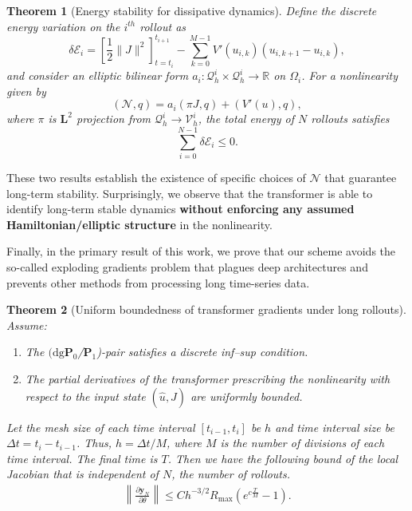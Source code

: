 \documentclass[12pt]{article}
\newtheorem{theorem}{Theorem}
\begin{document}
\begin{theorem}[Energy stability for dissipative dynamics] \label{thm:dissipative}
    Define the discrete energy variation on the $i^{th}$ rollout as
    \begin{equation*}
        \delta \mathcal{E}_i = \left[\frac12 \|J\|^2\right]_{t = t_{i}}^{t_{i+1}} - \sum_{k=0}^{M-1} V'(u_{i,k}) \left( u_{i,k+1} - u_{i,k}\right),
    \end{equation*}
    and consider an elliptic bilinear form $a_i:\mathcal{Q}_h^i \times \mathcal{Q}_h^i \rightarrow \mathbb{R}$ on $\Omega_i$.  For a nonlinearity given by
    \begin{equation*}
        (\mathcal{N},q) = a_i(\pi J, q) + (V'(u),q),
    \end{equation*}
    where $\pi$ is $\mathbf{L}^2$ projection from $\mathcal{Q}_h^i\rightarrow\mathcal{V}_h^i$,  the total energy of $N$ rollouts satisfies
    \begin{equation*}
       \sum_{i=0}^{N-1} \delta \mathcal{E}_i \leq 0.
    \end{equation*}
\end{theorem}
These two results establish the existence of specific choices of $\mathcal{N}$ that guarantee long-term stability. Surprisingly, we observe that the transformer is able to identify long-term stable dynamics \textbf{without enforcing any assumed Hamiltonian/elliptic structure} in the nonlinearity.

Finally, in the primary result of this work, we prove that our scheme avoids the so-called exploding gradients problem that plagues deep architectures and prevents other methods from processing long time-series data.

\begin{theorem}[Uniform boundedness of transformer gradients under long rollouts] \label{thm:bounded_jacobian}
	Assume:
	\begin{enumerate}
		\item The $(\mathrm{dg}\mathbf{P}_0$/$\mathbf{P}_1$)-pair satisfies a discrete inf--sup
		condition.
		\item The partial derivatives of the transformer prescribing the nonlinearity with respect to the input state $(\hat u,\hat J)$
		are uniformly bounded.
	\end{enumerate}
Let the mesh size of each time interval $[t_{i-1}, t_i]$ be $h$ and time interval size be $\Delta t = t_i - t_{i-1}$.  Thus, $h = \Delta t/M$, where $M$ is the number of divisions of each time interval.  The final time is $T$.  Then we have the following bound of the local Jacobian that is independent of $N$, the number of rollouts.
\begin{align*}
	\left \|	\frac{\partial \bm{y}_{N}}{\partial \theta}  \right \|  \leq C h^{-3/2} R_{\max} \left(e^{c\frac{T}{M}} - 1 \right).
\end{align*}
\end{theorem}
\end{document}
